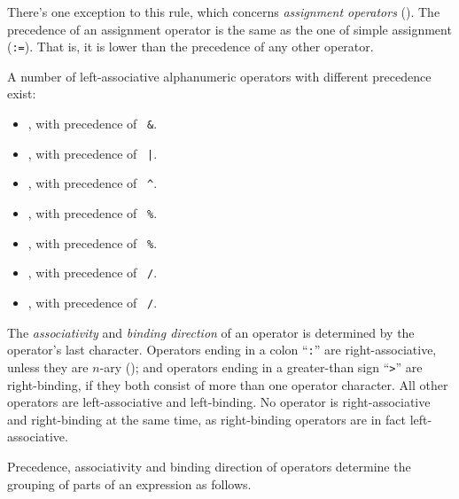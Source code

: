 There's one exception to this rule, which concerns {\em assignment operators} (). The precedence of an assignment operator is the same as the one of simple assignment (\lstinline!:=!). That is, it is lower than the precedence of any other operator. 

A number of left-associative alphanumeric operators with different precedence exist:
\begin{itemize}
  \item {}, with precedence of ~\lstinline!&!. 
  \item {}, with precedence of ~\lstinline!|!.  
  \item {}, with precedence of ~\lstinline!^!.  
  \item {}, with precedence of ~\lstinline!%!. 
  \item {}, with precedence of ~\lstinline!%!. 
  \item {}, with precedence of ~\lstinline!/!. 
  \item {}, with precedence of ~\lstinline!/!.   
\end{itemize}

The {\em associativity} and {\em binding direction} of an operator is determined by the operator's last character. Operators ending in a colon ``\lstinline!:!'' are right-associative, unless they are $n$-ary (); and operators ending in a greater-than sign ``\lstinline!>!'' are right-binding, if they both consist of more than one operator character. All other operators are left-associative and left-binding. No operator is right-associative and right-binding at the same time, as right-binding operators are in fact left-associative. 

Precedence, associativity and binding direction of operators determine the grouping of parts of an expression as follows.


